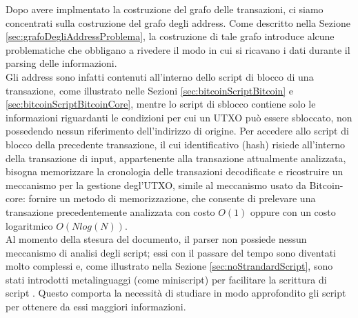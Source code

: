 Dopo avere implmentato la  costruzione del grafo delle transazioni, ci siamo concentrati sulla costruzione del grafo degli address. Come descritto nella Sezione \ref{sec:grafoDegliAddressProblema}, la costruzione di tale grafo introduce alcune problematiche che obbligano a rivedere il modo in cui si ricavano i dati durante il parsing delle informazioni.\\
Gli address sono infatti contenuti all'interno dello script di blocco di una transazione, come illustrato nelle Sezioni \ref{sec:bitcoinScriptBitcoin} e \ref{sec:bitcoinScriptBitcoinCore}, mentre lo script di sblocco contiene solo le informazioni riguardanti le condizioni per cui un UTXO può essere sbloccato, non possedendo nessun riferimento dell'indirizzo di origine.
Per accedere allo script di blocco della precedente transazione, il cui identificativo (hash) risiede all'interno della transazione di input, appartenente alla transazione attualmente analizzata, bisogna memorizzare la cronologia delle transazioni decodificate e ricostruire un meccanismo per la gestione degl'UTXO, simile al meccanismo usato da Bitcoin-core: fornire un metodo di memorizzazione, che consente di prelevare una transazione precedentemente analizzata con costo $O(1)$ oppure con un costo logaritmico $O(N log(N))$.\\
Al momento della stesura del documento, il parser non possiede nessun meccanismo di analisi degli script; essi con il passare del tempo sono diventati molto complessi e, come illustrato nella Sezione \ref{sec:noStrandardScript}, sono stati   introdotti metalinguaggi (come miniscript) per facilitare la scrittura di script . Questo comporta la necessità di studiare in modo approfondito gli script per ottenere da essi maggiori informazioni.

